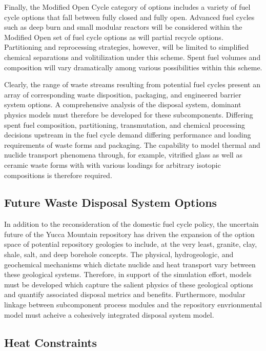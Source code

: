Finally, the Modified Open Cycle category of options includes a variety of fuel cycle options that 
fall between fully closed and fully open. Advanced fuel cycles such as deep burn and small modular 
reactors will be considered within the Modified Open set of fuel cycle options as will partial 
recycle options. Partitioning and reprocessing strategies, however, will be limited to simplified 
chemical separations and volitilization under this scheme. Spent fuel volumes and composition will 
vary dramatically among various possibilities within this scheme.  

Clearly, the range of waste streams resulting from potential fuel cycles present an array of 
corresponding waste disposition, packaging, and engineered barrier system options. A comprehensive 
analysis of the disposal system, dominant physics models must therefore be developed for these 
subcomponents.  Differing spent fuel composition, partitioning, transmutation, and chemical 
processing decisions upstream in the fuel cycle demand differing performance and loading 
requirements of waste forms and packaging. The capability to model thermal and nuclide transport 
phenomena through, for example, vitrified glass as well as ceramic waste forms with with various 
loadings for arbitrary isotopic compositions is therefore required.  

\subsection{Future Waste Disposal System Options}

In addition to the reconsideration of the domestic fuel cycle policy, the uncertain future of the 
Yucca Mountain repository has driven the expansion of the option space of potential repository 
geologies to include, at the very least, granite, clay, shale, salt, and deep borehole concepts. The
physical, hydrogeologic, and geochemical mechanisms which dictate nuclide and heat transport vary 
between these geological systems. Therefore, in support of the simulation effort, models must be 
developed which capture the salient physics of these geological options and quantify associated 
disposal metrics and benefits.  Furthermore, modular linkage between subcomponent process modules 
and the repository envrionmental model must acheive a cohesively integrated disposal system model.  

\subsection{Heat Constraints}

